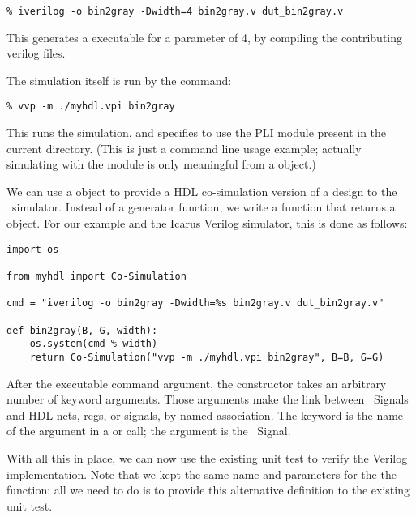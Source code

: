 \begin{verbatim}
% iverilog -o bin2gray -Dwidth=4 bin2gray.v dut_bin2gray.v

\end{verbatim}

This generates a  executable for a parameter 
of 4, by compiling the contributing verilog files.

The simulation itself is run by the  command:

\begin{verbatim}
% vvp -m ./myhdl.vpi bin2gray

\end{verbatim}

This runs the  simulation, and specifies to use the
 PLI module present in the current directory. (This is 
just a command line usage example; actually simulating with the
 module is only meaningful from a
 object.)

We can use a  object to provide a HDL co-simulation
version of a design to the \myhdl\ simulator. Instead of a generator
function, we write a function that returns a 
object. For our example and the Icarus Verilog simulator, this is done
as follows:

\begin{verbatim}
import os

from myhdl import Co-Simulation

cmd = "iverilog -o bin2gray -Dwidth=%s bin2gray.v dut_bin2gray.v"
      
def bin2gray(B, G, width):
    os.system(cmd % width)
    return Co-Simulation("vvp -m ./myhdl.vpi bin2gray", B=B, G=G)

\end{verbatim}

After the executable command argument, the 
constructor takes an arbitrary number of keyword arguments. Those
arguments make the link between \myhdl\ Signals and HDL nets, regs, or
signals, by named association. The keyword is the name of the argument
in a  or  call; the argument is
the \myhdl\ Signal.

With all this in place, we can now use the existing unit test
to verify the Verilog implementation. Note that we kept the
same name and parameters for the the  function:
all we need to do is to provide this alternative definition
to the existing unit test.

